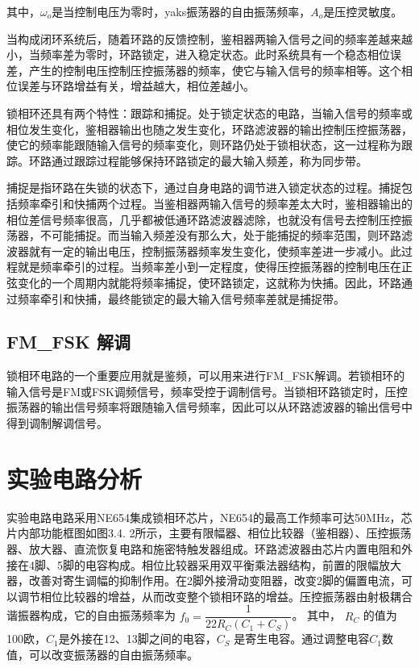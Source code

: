 \documentclass{../source/Experiment}
\begin{document}
        其中，$\omega_o$是当控制电压为零时，yaks振荡器的自由振荡频率，$A_o$是压控灵敏度。

        当构成闭环系统后，随着环路的反馈控制，鉴相器两输入信号之间的频率差越来越小，当频率差为零时，环路锁定，进入稳定状态。此时系统具有一个稳态相位误差，产生的控制电压控制压控振荡器的频率，使它与输入信号的频率相等。这个相位误差与环路增益有关，增益越大，相位差越小。

        锁相环还具有两个特性：跟踪和捕捉。处于锁定状态的电路，当输入信号的频率或相位发生变化，鉴相器输出也随之发生变化，环路滤波器的输出控制压控振荡器，使它的频率能跟随输入信号的频率变化，则环路仍处于锁相状态，这一过程称为跟踪。环路通过跟踪过程能够保持环路锁定的最大输入频差，称为同步带。

        捕捉是指环路在失锁的状态下，通过自身电路的调节进入锁定状态的过程。捕捉包括频率牵引和快捕两个过程。当鉴相器两输入信号的频率差太大时，鉴相器输出的相位差信号频率很高，几乎都被低通环路滤波器滤除，也就没有信号去控制压控振荡器，不可能捕捉。而当输入频差没有那么大，处于能捕捉的频率范围，则环路滤波器就有一定的输出电压，控制振荡器频率发生变化，使频率差进一步减小。此过程就是频率牵引的过程。当频率差小到一定程度，使得压控振荡器的控制电压在正弦变化的一个周期内就能将频率捕捉，使环路锁定，这就称为快捕。因此，环路通过频率牵引和快捕，最终能锁定的最大输入信号频率差就是捕捉带。

        
        \subsection{FM\_FSK 解调}
        锁相环电路的一个重要应用就是鉴频，可以用来进行FM\_FSK解调。若锁相环的输入信号是FM或FSK调频信号，频率受控于调制信号。当锁相环路锁定时，压控振荡器的输出信号频率将跟随输入信号频率，因此可以从环路滤波器的输出信号中得到调制解调信号。

    \section{实验电路分析}
    实验电路电路采用NE654集成锁相环芯片，NE654的最高工作频率可达50MHz，芯片内部功能框图如图3.4. 2所示，主要有限幅器、相位比较器（鉴相器）、压控振荡器、放大器、直流恢复电路和施密特触发器组成。环路滤波器由芯片内置电阻和外接在4脚、5脚的电容构成。相位比较器采用双平衡乘法器结构，前置的限幅放大器，改善对寄生调幅的抑制作用。在2脚外接滑动变阻器，改变2脚的偏置电流，可以调节相位比较器的增益，从而改变整个锁相环路的增益。压控振荡器由射极耦合谐振器构成，它的自由振荡频率为
    $f_0 = \dfrac{1}{22R_C(C_1 + C_S)}$。
    其中， $R_C$ 的值为100欧，$C_1$是外接在12、13脚之间的电容，$C_S$ 是寄生电容。通过调整电容$C_1$数值，可以改变振荡器的自由振荡频率。
\end{document}
